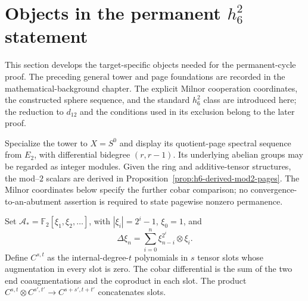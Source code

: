 \section{Objects in the permanent $h_6^2$ statement}
\label{chap:h6-statement}

This section develops the target-specific objects needed for the permanent-cycle
proof. The preceding general tower and page foundations are recorded in the
mathematical-background chapter. The explicit Milnor cooperation coordinates, the
constructed sphere sequence, and the standard $h_6^2$ class are introduced
here; the reduction to $d_{12}$ and the conditions used in its exclusion
belong to the later proof.

\begin{definition}
  \label{def:h6-constructed-sphere-sequence}
  \notready
  Specialize the tower to $X=S^0$ and display its quotient-page spectral
  sequence from $E_2$, with differential bidegree $(r,r-1)$.
  Its underlying abelian groups may be regarded as integer modules.
  Given the ring and additive-tensor structures, the mod--$2$ scalars are
  derived in Proposition~\ref{prop:h6-derived-mod2-pages}. The Milnor
  coordinates below specify the further cobar comparison; no
  convergence-to-an-abutment assertion is required to state pagewise
  nonzero permanence.
\end{definition}

\begin{definition}
  \label{def:h6-milnor-cobar}
  \leanok
  Set $\mathcal A_*=\mathbb F_2[\xi_1,\xi_2,\ldots]$, with
  $|\xi_i|=2^i-1$, $\xi_0=1$, and
  \[
    \Delta\xi_n=\sum_{i=0}^n\xi_{n-i}^{2^i}\otimes\xi_i.
  \]
  Define $C^{s,t}$ as the internal-degree-$t$ polynomials in $s$ tensor
  slots whose augmentation in every slot is zero.  The cobar differential
  is the sum of the two end coaugmentations and the coproduct in each slot.
  The product $C^{s,t}\otimes C^{s',t'}\to C^{s+s',t+t'}$ concatenates slots.
\end{definition}

